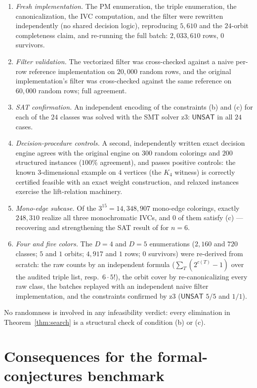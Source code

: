 \documentclass[11pt]{article}
\theoremstyle{definition}
\begin{document}
\begin{enumerate}[label=(V\arabic*)]
\item \emph{Fresh implementation.} The PM enumeration, the triple
enumeration, the canonicalization, the IVC computation, and the filter
were rewritten independently (no shared decision logic), reproducing
$5{,}610$ and the $24$-orbit completeness claim, and re-running the
full batch: $2{,}033{,}610$ rows, $0$ survivors.
\item \emph{Filter validation.} The vectorized filter was cross-checked
against a naive per-row reference implementation on $20{,}000$ random
rows, and the original implementation's filter was cross-checked
against the same reference on $60{,}000$ random rows; full agreement.
\item \emph{SAT confirmation.} An independent encoding of the
constraints (b) and (c) for each of the $24$ classes was solved with
the SMT solver z3: $\textsf{UNSAT}$ in all $24$ cases.
\item \emph{Decision-procedure controls.} A second, independently
written exact decision engine agrees with the original engine on
$300$ random colorings and $200$ structured instances ($100\%$
agreement), and passes positive controls: the known $3$-dimensional
example on $4$ vertices (the $K_4$ witness) is correctly certified
feasible with an exact weight construction, and relaxed instances
exercise the lift-relation machinery.
\item \emph{Mono-edge subcase.} Of the $3^{15}=14{,}348{,}907$
mono-edge colorings, exactly $248{,}310$ realize all three
monochromatic IVCs, and $0$ of them satisfy (c) --- recovering and
strengthening the SAT result of \cite{CLA22} for $n=6$.
\item \emph{Four and five colors.} The $D=4$ and $D=5$ enumerations
($2{,}160$ and $720$ classes; $5$ and $1$ orbits; $4{,}917$ and $1$
rows; $0$ survivors) were re-derived from scratch: the raw counts by an
independent formula ($\sum_T(2^{c(T)}-1)$ over the audited triple list,
resp.\ $6\cdot 5!$), the orbit cover by re-canonicalizing every raw
class, the batches replayed with an independent naive filter
implementation, and the constraints confirmed by z3 ($\textsf{UNSAT}$
$5/5$ and $1/1$).
\end{enumerate}

No randomness is involved in any infeasibility verdict: every
elimination in Theorem~\ref{thm:search} is a structural check of
condition (b) or (c).

\section{Consequences for the formal-conjectures benchmark}
\label{sec:consequences}
\end{document}
